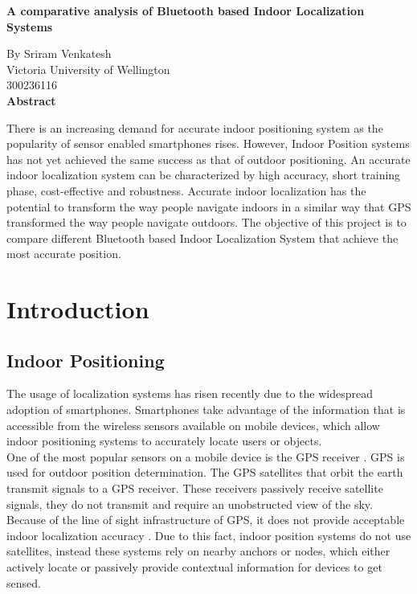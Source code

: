 \documentclass[12pt]{article}
\begin{document}
\begin{titlepage}
\begin{center}
	\Huge
	\textbf{A comparative analysis of Bluetooth based Indoor Localization Systems} \\
	\large    

	\vspace{0.5cm}
	By Sriram Venkatesh\\
	Victoria University of Wellington\\
	300236116 \\

	\vspace{0.9cm}
	\textbf{Abstract}
\end{center}
\doublespacing
	There is an increasing demand for accurate indoor positioning system as the popularity of sensor enabled smartphones rises. However, Indoor Position systems has not yet achieved the same success as that of outdoor positioning. An accurate indoor localization system can be characterized by high accuracy, short training phase, cost-effective and robustness. Accurate indoor localization has the potential to transform the way people navigate indoors in a similar way that GPS transformed the way people navigate outdoors. The objective of this project is to compare different Bluetooth based Indoor Localization System that achieve the most accurate position. 


\end{titlepage}

\doublespacing
\section{Introduction}

\subsection{Indoor Positioning}
The usage of localization systems has risen recently due to the widespread adoption of smartphones. Smartphones take advantage of the information that is accessible from the wireless sensors available on mobile devices, which allow indoor positioning systems to accurately locate users or objects. \\

One of the most popular sensors on a mobile device is the GPS receiver \cite{HABITS}. GPS is used for outdoor position determination. The GPS satellites that orbit the earth transmit signals to a GPS receiver. These receivers passively receive satellite signals, they do not transmit and require an unobstructed view of the sky. \cite{active-passive} Because of the line of sight infrastructure of GPS, it does not provide acceptable indoor localization accuracy \cite{fusionmethod}. Due to this fact, indoor position systems do not use satellites, instead these systems rely on nearby anchors or nodes, which either actively locate or passively provide contextual information for devices to get sensed. \\
\end{document}
